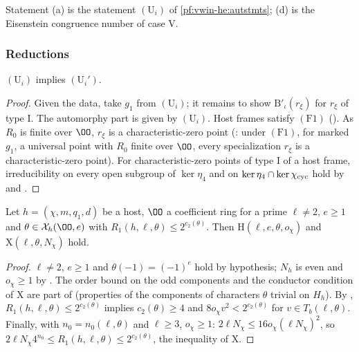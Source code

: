 Statement (a) is the statement $(\mathrm{U}_i)$ of \cref{pf:vwin-he:autstmts}; (d) is the Eisenstein congruence number of case V.

\subsubsection{Reductions}

\begin{lemma}\label{pf:eis:s6}
$(\mathrm{U}_i)$ implies $(\mathrm{U}_i')$.
\end{lemma}

\begin{proof}
Given the data, take $g_1$ from $(\mathrm{U}_i)$; it remains to show $\mathrm{B}'_\iota(r_\xi)$ for $r_\xi$ of type I. The automorphy part is given by
$(\mathrm{U}_i)$. Host frames satisfy $(\mathrm{F1})$ (). As $R_0$ is finite over $\OO$,
$r_\xi$ is a characteristic-zero point (: under $(\mathrm{F1})$, for marked
$g_1$, a universal point with $R_0$ finite over $\OO$, every specialization $r_\xi$ is a characteristic-zero point). For characteristic-zero
points of type I of a host frame, irreducibility on every open subgroup of $\ker\eta_4$ and on $\ker\eta_4\cap\ker\chi_{\mathrm{cyc}}$ hold by
 and .
\end{proof}

\begin{lemma}\label{pf:eis:hostdata}
Let $h=(\chi,m,q_1,d)$ be a host, $\OO$ a coefficient ring for a prime $\ell\ne2$, $e\ge1$ and $\theta\in\eisX_h(\OO,e)$ with
$R_1(h,\ell,\theta)\le2^{c_2(\theta)}$. Then $\mathrm{H}(\ell,e,\theta,o_\chi)$ and $\mathrm{X}(\ell,\theta,N_\chi)$ hold.
\end{lemma}

\begin{proof}
$\ell\ne2$, $e\ge1$ and $\theta(-1)=(-1)^e$ hold by hypothesis; $N_h$ is even and $o_\chi\ge1$ by
. The order bound on the odd components and the conductor condition of $\mathrm{X}$ are part
of  (properties of the components of characters $\theta$ trivial on $H_h$). By
, $R_1(h,\ell,\theta)\le2^{c_2(\theta)}$ implies $c_2(\theta)\ge4$ and
$8o_\chi v^2<2^{c_2(\theta)}$ for $v\in T_b(\ell,\theta)$. Finally, with $n_0=n_0(\ell,\theta)$ and $\ell\ge3$, $o_\chi\ge1$:
$2\ell N_\chi\le16o_\chi(\ell N_\chi)^2$, so $2\ell N_\chi4^{n_0}\le R_1(h,\ell,\theta)\le2^{c_2(\theta)}$, the inequality of $\mathrm{X}$.
\end{proof}

